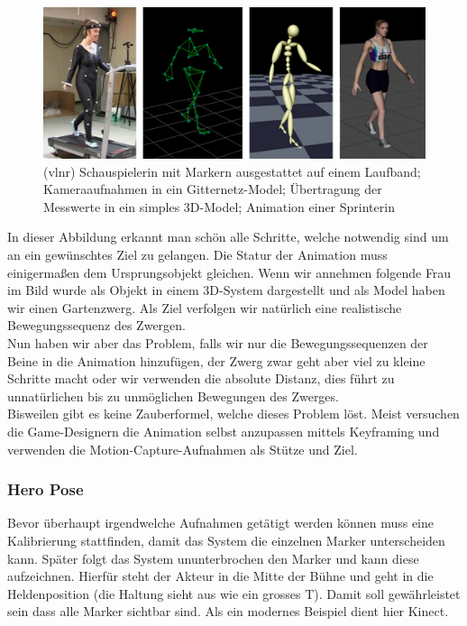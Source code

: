\begin{figure}[htbp]
\centering
\includegraphics[scale=0.6]{include/opt_mocap.jpg}
\caption{(vlnr) Schauspielerin mit Markern ausgestattet auf einem Laufband; Kameraaufnahmen in ein Gitternetz-Model; Übertragung der Messwerte in ein simples 3D-Model; Animation einer Sprinterin}
\end{figure}

In dieser Abbildung erkannt man schön alle Schritte, welche notwendig sind um an ein gewünschtes Ziel zu gelangen. Die Statur der Animation muss einigermaßen dem Ursprungsobjekt gleichen. Wenn wir annehmen folgende Frau im Bild wurde als Objekt in einem 3D-System dargestellt und als Model haben wir einen Gartenzwerg. Als Ziel verfolgen wir natürlich eine realistische Bewegungssequenz des Zwergen. \\
Nun haben wir aber das Problem, falls wir nur die Bewegungssequenzen der Beine in die Animation hinzufügen, der Zwerg zwar geht aber viel zu kleine Schritte macht oder wir verwenden die absolute Distanz, dies führt zu unnatürlichen bis zu unmöglichen Bewegungen des Zwerges. \\
Bisweilen gibt es keine Zauberformel, welche dieses Problem löst. Meist versuchen die Game-Designern die Animation selbst anzupassen mittels Keyframing und verwenden die Motion-Capture-Aufnahmen als Stütze und Ziel.

\subsubsection{Hero Pose}
Bevor überhaupt irgendwelche Aufnahmen getätigt werden können muss eine Kalibrierung stattfinden, damit das System die einzelnen Marker unterscheiden kann. Später folgt das System ununterbrochen den Marker und kann diese aufzeichnen. Hierfür steht der Akteur in die Mitte der Bühne und geht in die Heldenposition (die Haltung sieht aus wie ein grosses T). Damit soll gewährleistet sein dass alle Marker sichtbar sind. Als ein modernes Beispiel dient hier Kinect.
 

